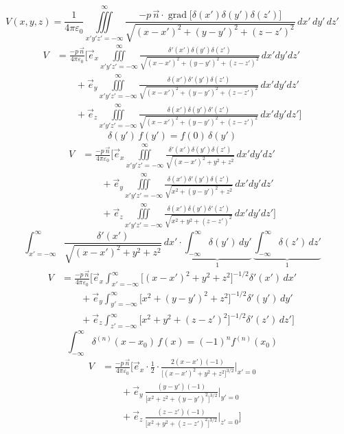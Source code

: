 \documentclass[11pt,a4paper]{article}
\begin{document}
\[ V(x,y,z)=\frac{1}{4\pi\varepsilon_0}\iiint\limits_{x'y'z'=-\infty}^{\infty}\frac{-p\,\vec n\cdot\operatorname{grad}\bigl[\delta(x')\delta(y')\delta(z')\bigr]}{\sqrt{(x-x')^2+(y-y')^2+(z-z')^2}}\,dx'\,dy'\,dz' \]
\begin{align*}
V&=\frac{-p\,\vec n}{4\pi\varepsilon_0}\Biggl[\vec e_x\iiint\limits_{x'y'z'=-\infty}^{\infty}\frac{\delta'(x')\delta(y')\delta(z')}{\sqrt{(x-x')^2+(y-y')^2+(z-z')^2}}\,dx'dy'dz'\\
&\qquad+\vec e_y\iiint\limits_{x'y'z'=-\infty}^{\infty}\frac{\delta(x')\delta'(y')\delta(z')}{\sqrt{(x-x')^2+(y-y')^2+(z-z')^2}}\,dx'dy'dz'\\
&\qquad+\vec e_z\iiint\limits_{x'y'z'=-\infty}^{\infty}\frac{\delta(x')\delta(y')\delta'(z')}{\sqrt{(x-x')^2+(y-y')^2+(z-z')^2}}\,dx'dy'dz'\Biggr]
\end{align*}
\[ \delta(y')\,f(y')=f(0)\,\delta(y') \]
\begin{align*}
V&=\frac{-p\,\vec n}{4\pi\varepsilon_0}\Biggl[\vec e_x\iiint\limits_{x'y'z'=-\infty}^{\infty}\frac{\delta'(x')\delta(y')\delta(z')}{\sqrt{(x-x')^2+y^2+z^2}}\,dx'dy'dz'\\
&\qquad+\vec e_y\iiint\limits_{x'y'z'=-\infty}^{\infty}\frac{\delta(x')\delta'(y')\delta(z')}{\sqrt{x^2+(y-y')^2+z^2}}\,dx'dy'dz'\\
&\qquad+\vec e_z\iiint\limits_{x'y'z'=-\infty}^{\infty}\frac{\delta(x')\delta(y')\delta'(z')}{\sqrt{x^2+y^2+(z-z')^2}}\,dx'dy'dz'\Biggr]
\end{align*}
\[ \int_{x'=-\infty}^{\infty}\frac{\delta'(x')}{\sqrt{(x-x')^2+y^2+z^2}}\,dx'\cdot\underbrace{\int_{-\infty}^{\infty}\delta(y')\,dy'}_{1}\,\underbrace{\int_{-\infty}^{\infty}\delta(z')\,dz'}_{1} \]
\begin{align*}
V&=\frac{-p\,\vec n}{4\pi\varepsilon_0}\Biggl[\vec e_x\int_{x'=-\infty}^{\infty}\bigl[(x-x')^2+y^2+z^2\bigr]^{-1/2}\delta'(x')\,dx'\\
&\qquad+\vec e_y\int_{y'=-\infty}^{\infty}\bigl[x^2+(y-y')^2+z^2\bigr]^{-1/2}\delta'(y')\,dy'\\
&\qquad+\vec e_z\int_{z'=-\infty}^{\infty}\bigl[x^2+y^2+(z-z')^2\bigr]^{-1/2}\delta'(z')\,dz'\Biggr]
\end{align*}
\[ \int_{-\infty}^{\infty}\delta^{(n)}(x-x_0)\,f(x)=(-1)^nf^{(n)}(x_0) \]
\begin{align*}
V&=\frac{-p\,\vec n}{4\pi\varepsilon_0}\Biggl[\vec e_x\cdot\frac12\cdot\frac{2(x-x')(-1)}{\bigl[(x-x')^2+y^2+z^2\bigr]^{3/2}}\Bigg|_{x'=0}\\
&\qquad+\vec e_y\,\frac{(y-y')(-1)}{\bigl[x^2+z^2+(y-y')^2\bigr]^{3/2}}\Bigg|_{y'=0}\\
&\qquad+\vec e_z\,\frac{(z-z')(-1)}{\bigl[x^2+y^2+(z-z')^2\bigr]^{3/2}}\Bigg|_{z'=0}\Biggr]
\end{align*}
\end{document}
